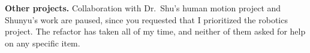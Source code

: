 \documentclass[11pt]{article}
\begin{document}

\medskip\noindent\textbf{Other projects.}
Collaboration with Dr.~Shu's human motion project and Shunyu's work are paused,
since you requested that I prioritized the robotics project. The refactor has taken all of my time, and neither of them asked
for help on any specific item.
\end{document}

